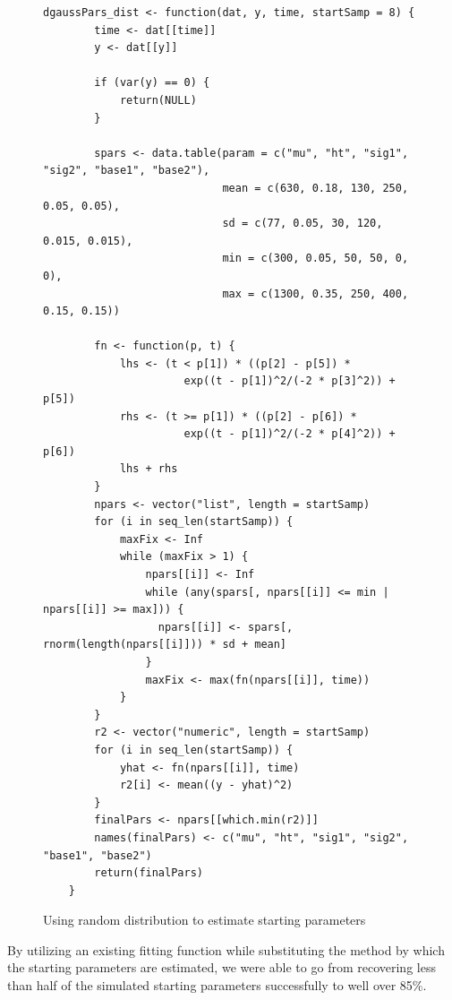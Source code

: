\documentclass{article}
\begin{document}
\begin{singlespace}
\begin{figure}[H]
\centering
\begin{BVerbatim}
dgaussPars_dist <- function(dat, y, time, startSamp = 8) {
        time <- dat[[time]]
        y <- dat[[y]]
        
        if (var(y) == 0) {
            return(NULL)
        }
        
        spars <- data.table(param = c("mu", "ht", "sig1", "sig2", "base1", "base2"),
                            mean = c(630, 0.18, 130, 250, 0.05, 0.05), 
                            sd = c(77, 0.05, 30, 120, 0.015, 0.015), 
                            min = c(300, 0.05, 50, 50, 0, 0), 
                            max = c(1300, 0.35, 250, 400, 0.15, 0.15))
        
        fn <- function(p, t) {
            lhs <- (t < p[1]) * ((p[2] - p[5]) * 
                      exp((t - p[1])^2/(-2 * p[3]^2)) + p[5])
            rhs <- (t >= p[1]) * ((p[2] - p[6]) * 
                      exp((t - p[1])^2/(-2 * p[4]^2)) + p[6])
            lhs + rhs
        }
        npars <- vector("list", length = startSamp)
        for (i in seq_len(startSamp)) {
            maxFix <- Inf
            while (maxFix > 1) {
                npars[[i]] <- Inf
                while (any(spars[, npars[[i]] <= min | npars[[i]] >= max])) {
                  npars[[i]] <- spars[, rnorm(length(npars[[i]])) * sd + mean]
                }
                maxFix <- max(fn(npars[[i]], time))
            }
        }
        r2 <- vector("numeric", length = startSamp)
        for (i in seq_len(startSamp)) {
            yhat <- fn(npars[[i]], time)
            r2[i] <- mean((y - yhat)^2)
        }
        finalPars <- npars[[which.min(r2)]]
        names(finalPars) <- c("mu", "ht", "sig1", "sig2", "base1", "base2")
        return(finalPars)
    }
\end{BVerbatim}
\caption{Using random distribution to estimate starting parameters}
\label{fig:gauss_form_dist}
\end{figure}
\end{singlespace}

By utilizing an existing fitting function while substituting the method by which the starting parameters are estimated, we were able to go from recovering less than half of the simulated starting parameters successfully to well over 85\%.

\end{document}
